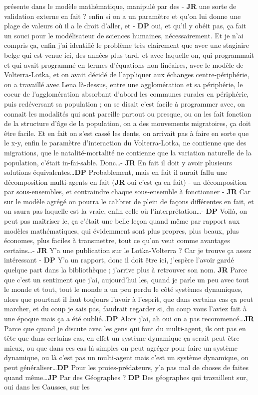 \documentclass[12pt]{article}
\begin{document}
présente dans le modèle mathématique, manipulé par des - \textbf{JR} une sorte de validation externe en fait ? enfin si on a un paramètre et qu'on lui donne une plage de valeurs où il a le droit d'aller, et - \textbf{DP} oui, et qu'il y obéit pas, ça fait un souci pour le modélisateur de sciences humaines, nécessairement. Et je n'ai compris ça, enfin j'ai identifié le problème très clairement que avec une stagiaire belge qui est venue ici, des années plus tard, et avec laquelle on, qui programmait et qui avait programmé en termes d'équations non-linéaires, avec le modèle de Volterra-Lotka, et on avait décidé de l'appliquer aux échanges centre-périphérie, on a travaillé avec Lena là-dessus, entre une agglomération et sa périphérie, le coeur de l'agglomération absorbant d'abord les communes rurales en périphérie, puis redéversant sa population ; on se disait c'est facile à programmer avec, on connait les modalités qui sont pareille partout ou presque, ou on les fait fonction de la structure d'âge de la population, on a des mouvements migratoires, ça doit être facile. Et en fait on s'est cassé les dents, on arrivait pas à faire en sorte que le x-y, enfin le paramètre d'interaction du Volterra-Lotka, ne contienne que des migrations, que le natalité-mortalité ne contienne que la variation naturelle de la population, c'était in-fai-sable. Donc\ldots - \textbf{JR} En fait il doit y avoir plusieurs solutions équivalentes\ldots \textbf{DP} Probablement, mais en fait il aurait fallu une décomposition multi-agents en fait (\textbf{JR} oui c'est ça en fait) - un décomposition par sous-ensembles, et contraindre chaque sous-ensemble à fonctionner - \textbf{JR} Car sur le modèle agrégé on pourra le calibrer de plein de façons différentes en fait, et on saura pas laquelle est la vraie, enfin celle où l'interprétation\ldots - \textbf{DP} Voilà, on peut pas maîtriser le, ça c'était une belle leçon quand même par rapport aux modèles mathématiques, qui évidemment sont plus propres, plus beaux, plus économes, plus faciles à transmettre, tout ce qu'on veut comme avantages certains\ldots - \textbf{JR} Y'a une publication sur le Lotka-Volterra ? Car je trouve ça assez intéressant - \textbf{DP} Y'a un rapport, donc il doit être ici, j'espère l'avoir gardé quelque part dans la bibliothèque ; j'arrive plus à retrouver son nom. \textbf{JR} Parce que c'est un sentiment que j'ai, aujourd'hui les, quand je parle un peu avec tout le monde et tout, tout le monde a un peu perdu le côté systèmes dynamiques, alors que pourtant il faut toujours l'avoir à l'esprit, que dans certains cas ça peut marcher, et du coup je sais pas, faudrait regarder si, du coup vous l'aviez fait à une époque mais ça a été oublié\ldots \textbf{DP} Alors j'ai, ah oui on a pas recommencé\ldots \textbf{JR} Parce que quand je discute avec les gens qui font du multi-agent, ils ont pas en tête que dans certains cas, en effet un système dynamique ça serait peut être mieux, ou que dans ces cas là simples on peut agréger pour faire un système dynamique, ou là c'est pas un multi-agent mais c'est un système dynamique, on peut généraliser\ldots \textbf{DP} Pour les proies-prédateurs, y'a pas mal de choses de faites quand même\ldots \textbf{JP} Par des Géographes ? \textbf{DP} Des géographes qui travaillent sur, oui dans les Causses, sur les 
\end{document}
